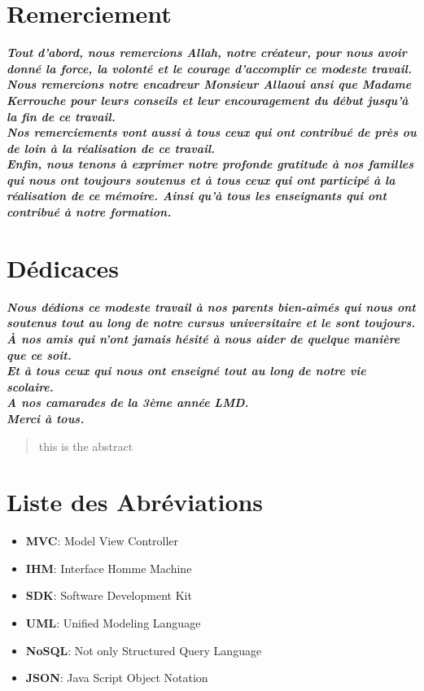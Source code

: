 \documentclass[french, a4paper, 12pt]{report}
\begin{document}
\chapter*{Remerciement}
\begin{center}
\Large \textbf{\textit{Tout d'abord, nous remercions Allah, notre créateur, pour nous avoir donné la force, la volonté et le courage d'accomplir ce modeste travail.\\
Nous remercions notre encadreur Monsieur Allaoui ansi que Madame Kerrouche pour leurs conseils et leur encouragement du début jusqu'à la fin de ce travail.\\
Nos remerciements vont aussi à tous ceux qui ont contribué de près ou de loin à la réalisation de ce travail.\\Enfin, nous tenons à exprimer notre profonde gratitude à nos familles qui nous ont toujours soutenus et à tous ceux qui ont participé à la réalisation de ce mémoire. Ainsi qu'à tous les enseignants qui ont contribué à notre formation.}}
\end{center}

\chapter*{Dédicaces}
\begin{center}
\Large \textbf{\textit{Nous dédions ce modeste travail à nos parents bien-aimés qui nous ont soutenus tout au long de notre cursus universitaire et le sont toujours.\\
À nos amis qui n'ont jamais hésité à nous aider de quelque manière que ce soit.\\
Et à tous ceux qui nous ont enseigné tout au long de notre vie scolaire.\\
A nos camarades de la 3ème année LMD.\\
Merci à tous.}}
\end{center}

\newpage
\begin{abstract}
this is the abstract
\end{abstract}


\tableofcontents

\newpage
\listoffigures

\newpage
\listoftables


\newpage
\chapter*{Liste des Abréviations}
	\begin{itemize}
		\item \textbf{MVC}:  Model View Controller
		\item \textbf{IHM}: Interface Homme Machine
		\item \textbf{SDK}: Software Development Kit
		\item \textbf{UML}: Unified Modeling Language
		\item \textbf{NoSQL}: Not only Structured Query Language
		\item \textbf{JSON}:  Java Script Object Notation
	\end{itemize}
\end{document}
